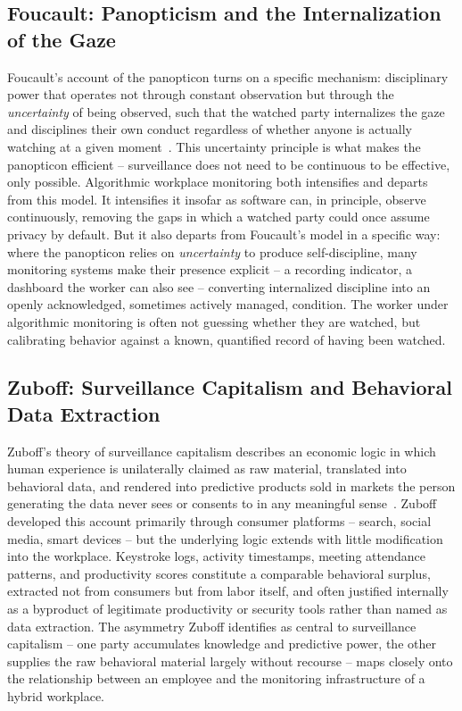 \documentclass[11pt]{article}
\begin{document}
\subsection{Foucault: Panopticism and the Internalization of the Gaze}

Foucault's account of the panopticon turns on a specific mechanism:
disciplinary power that operates not through constant observation
but through the \emph{uncertainty} of being observed, such that the
watched party internalizes the gaze and disciplines their own
conduct regardless of whether anyone is actually watching at a given
moment~\citep{foucault1975}. This uncertainty principle is what
makes the panopticon efficient -- surveillance does not need to be
continuous to be effective, only possible. Algorithmic workplace
monitoring both intensifies and departs from this model. It
intensifies it insofar as software can, in principle, observe
continuously, removing the gaps in which a watched party could
once assume privacy by default. But it also departs from Foucault's
model in a specific way: where the panopticon relies on
\emph{uncertainty} to produce self-discipline, many monitoring
systems make their presence explicit -- a recording indicator, a
dashboard the worker can also see -- converting internalized
discipline into an openly acknowledged, sometimes actively managed,
condition. The worker under algorithmic monitoring is often not
guessing whether they are watched, but calibrating behavior against
a known, quantified record of having been watched.

\subsection{Zuboff: Surveillance Capitalism and Behavioral Data Extraction}

Zuboff's theory of surveillance capitalism describes an economic
logic in which human experience is unilaterally claimed as raw
material, translated into behavioral data, and rendered into
predictive products sold in markets the person generating the data
never sees or consents to in any meaningful
sense~\citep{zuboff2019}. Zuboff developed this account primarily
through consumer platforms -- search, social media, smart devices --
but the underlying logic extends with little modification into the
workplace. Keystroke logs, activity timestamps, meeting attendance
patterns, and productivity scores constitute a comparable behavioral
surplus, extracted not from consumers but from labor itself, and
often justified internally as a byproduct of legitimate
productivity or security tools rather than named as data extraction.
The asymmetry Zuboff identifies as central to surveillance
capitalism -- one party accumulates knowledge and predictive power,
the other supplies the raw behavioral material largely without
recourse -- maps closely onto the relationship between an employee
and the monitoring infrastructure of a hybrid workplace.
\end{document}
